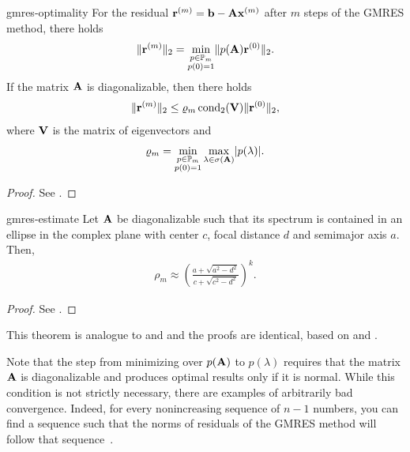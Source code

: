 \begin{Theorem}{gmres-optimality}
  For the residual $\mathbf r^{(m)} = \mathbf b-\mathbf A\mathbf x^{(m)}$ after $m$  steps of
  the GMRES method, there holds
  \begin{gather}
    \lVert\mathbf r^{(m)}\rVert_2 = \min_{\substack{p\in\mathbb P_m\\p(0) = 1}}
    \lVert p(\mathbf A)\mathbf r^{(0)}\rVert_2.
  \end{gather}
  If the matrix $\mathbf A$ is diagonalizable, then there holds
    \begin{gather}
    \lVert\mathbf r^{(m)}\rVert_2 \le \varrho_m \operatorname{cond}_2(\mathbf V) \lVert\mathbf r^{(0)}\rVert_2,
  \end{gather}
  where $\mathbf V$ is the matrix of eigenvectors and
  \begin{gather}
    \varrho_m = \min_{\substack{p\in\mathbb P_m\\p(0) = 1}} \max_{\lambda\in\sigma(\mathbf A)} \lvert p(\lambda)\rvert.
  \end{gather}
\end{Theorem}

\begin{proof}
  See \cite[Proposition 6.32]{Saad00}.
\end{proof}

\begin{Corollary}{gmres-estimate}
  Let $\mathbf A$ be diagonalizable such that its spectrum is contained in
  an ellipse in the complex plane with center $c$, focal distance $d$
  and semimajor axis $a$. Then,
  \begin{gather}
     \rho_m \approx \left(
      \frac{a+\sqrt{a^2-d^2}}{c+\sqrt{c^2-d^2}}
      \right)^k.
  \end{gather}
\end{Corollary}

\begin{proof}
  See \cite[Corollary 6.33]{Saad00}.
\end{proof}

\begin{remark}
  This theorem is analogue to  and
   and the proofs are
  identical, based on  and
  .

  Note that the step from minimizing over $p(\mathbf A)$ to $p(\lambda)$
  requires that the matrix $\mathbf A$ is diagonalizable and produces
  optimal results only if it is normal. While this condition is not
  strictly necessary, there are examples of arbitrarily bad
  convergence. Indeed, for every nonincreasing sequence of $n-1$
  numbers, you can find a sequence such that the norms of residuals of
  the GMRES method will follow that
  sequence~\cite{GreenbaumPtakStrakos96}.
\end{remark}

